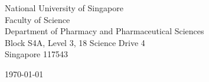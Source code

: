 \begin{minipage}{0.49\textwidth}
\begin{flushleft}
\noindent
National University of Singapore\\
Faculty of Science\\
Department of Pharmacy and Pharmaceutical Sciences\\
Block S4A, Level 3, 18 Science Drive 4\\
Singapore 117543\\
\end{flushleft}
\end{minipage}
\begin{minipage}{0.47\textwidth}
\begin{flushright}
\today
\end{flushright}
\end{minipage} \\

\newcommand{\univ}{National University of Singapore}
\newcommand{\univshort}{NUS}
\newcommand{\degree}{Ph.D.}
\newcommand{\dept}{Pharmacy and Pharmaceutical Sciences}



